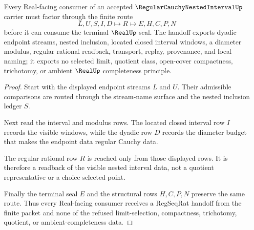 \begin{theorem}
\label{thm:regular-cauchy-nested-interval-regseqrat-handoff}
Every Real-facing consumer of an accepted $\RegularCauchyNestedIntervalUp$ carrier must factor through the finite route
$$
L,U,S,I,D \longmapsto R \longmapsto E,H,C,P,N
$$
before it can consume the terminal $\RealUp$ seal. The handoff exports dyadic endpoint streams, nested inclusion, located closed interval windows, a diameter modulus, regular rational readback, transport, replay, provenance, and local naming; it exports no selected limit, quotient class, open-cover compactness, trichotomy, or ambient $\RealUp$ completeness principle.
\end{theorem}
\begin{proof}
Start with the displayed endpoint streams $L$ and $U$. Their admissible comparisons are routed through the stream-name surface and the nested inclusion ledger $S$.

Next read the interval and modulus rows. The located closed interval row $I$ records the visible windows, while the dyadic row $D$ records the diameter budget that makes the endpoint data regular Cauchy data.

The regular rational row $R$ is reached only from those displayed rows. It is therefore a readback of the visible nested interval data, not a quotient representative or a choice-selected point.

Finally the terminal seal $E$ and the structural rows $H,C,P,N$ preserve the same route. Thus every Real-facing consumer receives a RegSeqRat handoff from the finite packet and none of the refused limit-selection, compactness, trichotomy, quotient, or ambient-completeness data.
\end{proof}



